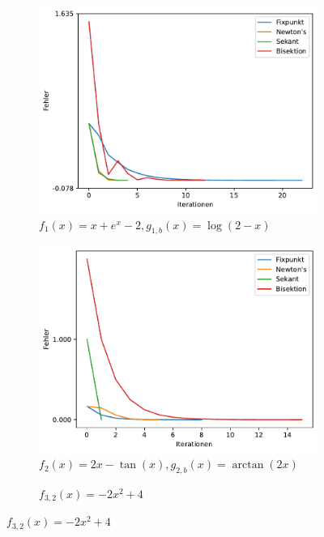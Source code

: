 \documentclass[10pt]{scrartcl}
\newcommand{\1}{1\hspace{-0,9ex}1}
\begin{document}
	\begin{figure}[!h]
		\centering
		\begin{subfigure}[b]{0.4\textwidth}
			\caption*{$f_1(x) = x + e^x-2, g_{1,b}(x)=\log(2-x)$}
			\includegraphics[width=\textwidth]{plots/plot.pdf}
		\end{subfigure}
		\begin{subfigure}[b]{0.4\textwidth}
			\caption*{$f_2(x) = 2x - \tan(x), g_{2,b}(x)=\arctan(2x)$}
			\includegraphics[width=\textwidth]{plots/plot1.pdf}
		\end{subfigure}
		\begin{subfigure}[b]{0.4\textwidth}
			\caption*{$f_{3,2}(x) = -2x^2 + 4$}

\end{subfigure}
\end{figure}
\end{document}
